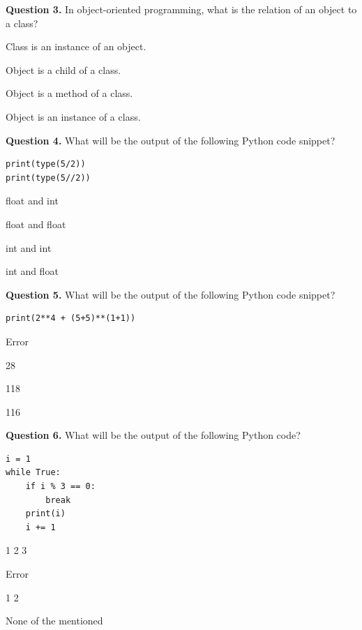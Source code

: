 \documentclass[11pt,a4paper]{article}
\begin{document}
\noindent   \textbf{Question 3.} In object-oriented programming, what is the relation of an object to a class?

\begin{parts}
  \item Class is an instance of an object.
  \item Object is a child of a class.
  \item Object is a method of a class.
  \item Object is an instance of a class.
\end{parts}

\medskip


\noindent   \textbf{Question 4.} What will be the output of the following Python code snippet?

\begin{lstlisting}
print(type(5/2))
print(type(5//2))
\end{lstlisting}

\begin{parts}
  \item float and int
  \item float and float
  \item int and int
  \item int and float
\end{parts}

\medskip


\noindent   \textbf{Question 5.} What will be the output of the following Python code snippet?

\begin{lstlisting}
print(2**4 + (5+5)**(1+1))
\end{lstlisting}

\begin{parts}
  \item Error
  \item 28
  \item 118
  \item 116
\end{parts}

\medskip


\noindent   \textbf{Question 6.} What will be the output of the following Python code?

\begin{lstlisting}
i = 1
while True:
    if i % 3 == 0:
        break
    print(i)
    i += 1
\end{lstlisting}

\begin{parts}
  \item 1 2 3
  \item Error
  \item 1 2
  \item None of the mentioned
\end{parts}
\end{document}
